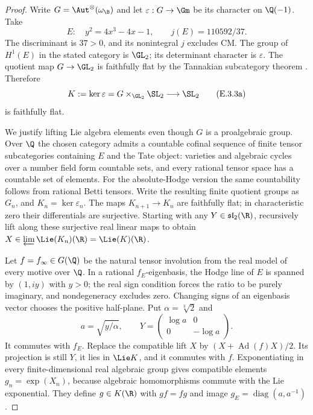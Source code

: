 \begin{proof}
Write $G=\Aut^\otimes(\omega_{\B})$ and let $\varepsilon:G\to\Gm$ be its character on $\Q(-1)$. Take
\[
 E:\quad y^2=4x^3-4x-1,\qquad j(E)=110592/37.
\]
The discriminant is $37>0$, and its nonintegral $j$ excludes CM. The group of $H^1(E)$ in the stated category is $\GL_2$; its determinant character is $\varepsilon$. The quotient map $G\to\GL_2$ is faithfully flat by the Tannakian subcategory theorem \cite[Proposition 2.21]{DM1982}. Therefore
\[
 K:=\ker\varepsilon=G\mathbin{\times}_{\GL_2}\SL_2
 \longrightarrow\SL_2
 \tag{E.3.3a}
\]
is faithfully flat.

We justify lifting Lie algebra elements even though $G$ is a proalgebraic group. Over $\Q$ the chosen category admits a countable cofinal sequence of finite tensor subcategories containing $E$ and the Tate object: varieties and algebraic cycles over a number field form countable sets, and every rational tensor space has a countable set of elements. For the absolute-Hodge version the same countability follows from rational Betti tensors. Write the resulting finite quotient groups as $G_n$, and $K_n=\ker\varepsilon_n$. The maps $K_{n+1}\to K_n$ are faithfully flat; in characteristic zero their differentials are surjective. Starting with any $Y\in\mathfrak{sl}_2(\R)$, recursively lift along these surjective real linear maps to obtain $X\in\varprojlim\Lie(K_n)(\R)=\Lie(K)(\R)$.

Let $f=f_\infty\in G(\Q)$ be the natural tensor involution from the real model of every motive over $\Q$. In a rational $f_E$-eigenbasis, the Hodge line of $E$ is spanned by $(1,iy)$ with $y>0$; the real sign condition forces the ratio to be purely imaginary, and nondegeneracy excludes zero. Changing signs of an eigenbasis vector chooses the positive half-plane. Put $\alpha=\sqrt[3]{2}$ and
\[
 a=\sqrt{y/\alpha},\qquad
 Y=\begin{pmatrix}\log a&0\\0&-\log a\end{pmatrix}.
\]
It commutes with $f_E$. Replace the compatible lift $X$ by $(X+\operatorname{Ad}(f)X)/2$. Its projection is still $Y$, it lies in $\Lie K$, and it commutes with $f$. Exponentiating in every finite-dimensional real algebraic group gives compatible elements $g_n=\exp(X_n)$, because algebraic homomorphisms commute with the Lie exponential. They define $g\in K(\R)$ with $gf=fg$ and image $g_E=\operatorname{diag}(a,a^{-1})$.


\end{proof}
